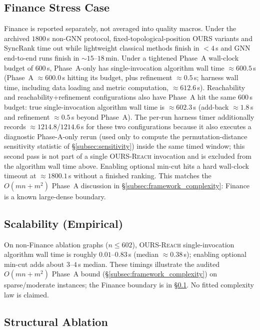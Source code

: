 \documentclass{article}
\begin{document}
\subsection{Finance Stress Case}
\label{subsec:finance}

Finance is reported separately, not averaged into quality macros.
Under the archived $1800$\,s non-GNN protocol, fixed-topological-position OURS variants and SyncRank time out while lightweight classical methods finish in $<4$\,s and GNN end-to-end runs finish in $\sim 15$--$18$\,min.
Under a tightened Phase~A wall-clock budget of $600$\,s, Phase~A-only has single-invocation algorithm wall time $\approx 600.5$\,s (Phase~A $\approx 600.0$\,s hitting its budget, plus refinement $\approx 0.5$\,s; harness wall time, including data loading and metric computation, $\approx 612.6$\,s). Reachability and reachability+refinement configurations also have Phase~A hit the same $600$\,s budget: true single-invocation algorithm wall time is $\approx 602.3$\,s (add-back $\approx 1.8$\,s and refinement $\approx 0.5$\,s beyond Phase~A). The per-run harness timer additionally records $\approx 1214.8$/$1214.6$\,s for these two configurations because it also executes a diagnostic Phase-A-only rerun (used only to compute the permutation-distance sensitivity statistic of \S\ref{subsec:sensitivity}) inside the same timed window; this second pass is not part of a single \textsc{OURS-Reach} invocation and is excluded from the algorithm wall time above. Enabling optional min-cut hits a hard wall-clock timeout at $\approx 1800.1$\,s without a finished ranking.
This matches the $O(mn+m^{2})$ Phase~A discussion in \S\ref{subsec:framework_complexity}: Finance is a known large-dense boundary.

\subsection{Scalability (Empirical)}
\label{subsec:scalability}

On non-Finance ablation graphs ($n\le 602$), \textsc{OURS-Reach} single-invocation algorithm wall time is roughly $0.01$--$0.83$\,s (median $\approx 0.38$\,s); enabling optional min-cut adds about $3$--$4$\,s median.
These timings illustrate the audited $O(mn+m^2)$ Phase~A bound (\S\ref{subsec:framework_complexity}) on sparse/moderate instances; the Finance boundary is in \S\ref{subsec:finance}. No fitted complexity law is claimed.

\subsection{Structural Ablation}
\label{subsec:ablation}
\end{document}
